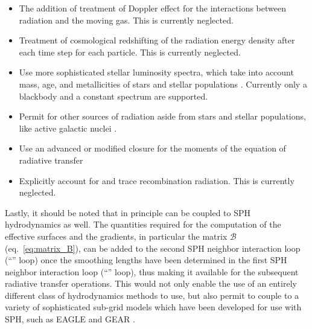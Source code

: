 \begin{itemize}
\item The addition of treatment of Doppler effect for the interactions between
radiation and the moving gas. This is currently neglected.

\item Treatment of cosmological redshifting of the radiation energy density after each time step
for each particle. This is currently neglected.

\item Use more sophisticated stellar luminosity spectra, which take into account mass, age, and
metallicities of stars and stellar populations
\citep[e.g.][]{bruzualStellarPopulationSynthesis2003, leithererStarburst99SynthesisModels1999,
stanwayReevaluatingOldStellar2018}. Currently only a blackbody and a constant spectrum are
supported.

\item Permit for other sources of radiation aside from stars and stellar populations, like active
galactic nuclei \citep[e.g.][]{costaDrivingGasShells2018, barnesRadiativeAGNFeedback2020}.

\item Use an advanced or modified closure for the moments of the equation of radiative transfer
\citep[e.g.][]{chanSmoothedParticleRadiation2021}

\item Explicitly account for and trace recombination radiation. This is currently neglected.

\end{itemize}

Lastly, it should be noted that in principle \GEARRT can be coupled to SPH hydrodynamics as well.
The quantities required for the computation of the effective surfaces \Aij and the gradients, in
particular the matrix $\mathcal{B}$ (eq.~\ref{eq:matrix_B}), can be added to the second SPH neighbor
interaction loop (``'' loop) once the smoothing lengths have been determined in the
first SPH neighbor interaction loop (``'' loop), thus making it available for the
subsequent radiative transfer operations. This would not only enable the use of an entirely
different class of hydrodynamics methods to use, but also permit to couple \GEARRT to a variety of
sophisticated sub-grid models which have been developed for use with SPH, such as EAGLE
\citep{schayeEAGLEProjectSimulating2015} and GEAR \citep{revazDynamicalChemicalEvolution2012}.


